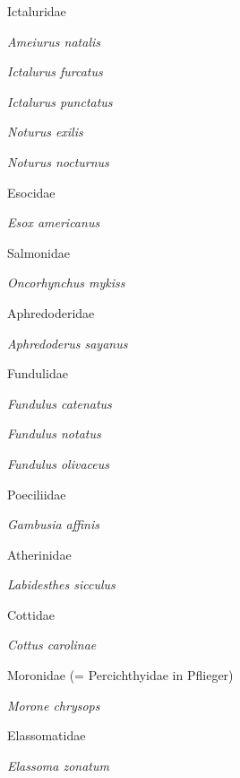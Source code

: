 \documentclass[11pt]{article}
\begin{document}
\begin{multicols}{2}
Ictaluridae\par
	\quad\textit{Ameiurus natalis}\par
	\quad\textit{Ictalurus furcatus}\par
	\quad\textit{Ictalurus punctatus}\par
	\quad\textit{Noturus exilis}\par
	\quad\textit{Noturus nocturnus}\par
\vspace{1ex}

Esocidae\par
	\quad\textit{Esox americanus}\par
\vspace{1ex}

Salmonidae\par
	\quad\textit{Oncorhynchus mykiss}\par
\vspace{1ex}

Aphredoderidae\par
	\quad\textit{Aphredoderus sayanus}\par
\vspace{1ex}

Fundulidae\par
	\quad\textit{Fundulus catenatus}\par
	\quad\textit{Fundulus notatus}\par
	\quad\textit{Fundulus olivaceus}\par
\vspace{1ex}

Poeciliidae\par
	\quad\textit{Gambusia affinis}\par
\vspace{1ex}

Atherinidae\par
	\quad\textit{Labidesthes sicculus}\par
\vspace{1ex}

Cottidae\par
	\quad\textit{Cottus carolinae}\par
\vspace{1ex}

Moronidae (= Percichthyidae in Pflieger)\par
	\quad\textit{Morone chrysops}\par
\vspace{1ex}

Elassomatidae\par
	\quad\textit{Elassoma zonatum}\par
\vspace{1ex}


\end{multicols}
\end{document}
